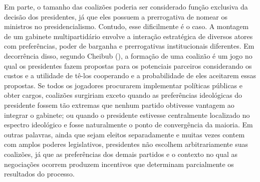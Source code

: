 Em parte, o tamanho das coalizões poderia ser considerado função exclusiva da decisão dos presidentes, já que eles possuem a prerrogativa de nomear os ministros no presidencialismo. Contudo, esse dificilmente é o caso. A montagem de um gabinete multipartidário envolve a interação estratégica de diversos atores com preferências, poder de barganha e prerrogativas institucionais diferentes. Em decorrência disso, segundo Cheibub (\citeyear{cheibub2007}), a formação de uma coalizão é um jogo no qual os presidentes fazem propostas para os potenciais parceiros considerando os custos e a utilidade de tê-los cooperando e a probabilidade de eles aceitarem essas propostas. Se todos os jogadores procurarem implementar políticas públicas e obter cargos, coalizões surgiriam exceto quando as preferências ideológicas do presidente fossem tão extremas que nenhum partido obtivesse vantagem ao integrar o gabinete; ou quando o presidente estivesse centralmente localizado no espectro ideológico e fosse naturalmente o ponto de convergência da maioria. Em outras palavras, ainda que sejam eleitos separadamente e muitas vezes contem com amplos poderes legislativos, presidentes não escolhem arbitrariamente suas coalizões, já que as preferências dos demais partidos e o contexto no qual as negociações ocorrem produzem incentivos que determinam parcialmente os resultados do processo.


